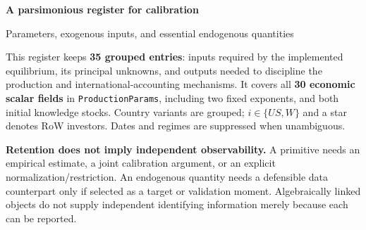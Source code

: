 \documentclass[10pt,a4paper,landscape]{article}
\newcommand{\code}[1]{{\footnotesize\texttt{#1}}}
\begin{document}
{\LARGE\sffamily\bfseries\color{heading}A parsimonious register for calibration}\par
{\large\sffamily Parameters, exogenous inputs, and essential endogenous quantities}\par

This register keeps \textbf{35 grouped entries}: inputs required by the implemented equilibrium, its principal unknowns, and outputs needed to discipline the production and international-accounting mechanisms. It covers all \textbf{30 economic scalar fields} in \code{ProductionParams}, including two fixed exponents, and both initial knowledge stocks. Country variants are grouped; $i\in\{US,W\}$ and a star denotes RoW investors. Dates and regimes are suppressed when unambiguous.

\textbf{Retention does not imply independent observability.} A primitive needs an empirical estimate, a joint calibration argument, or an explicit normalization/restriction. An endogenous quantity needs a defensible data counterpart only if selected as a target or validation moment. Algebraically linked objects do not supply independent identifying information merely because each can be reported.
\end{document}
